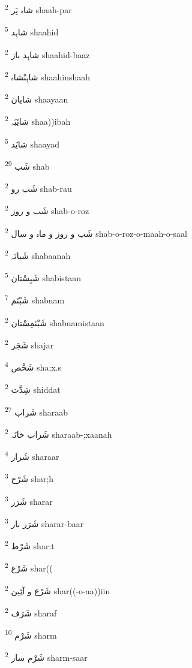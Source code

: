 \documentclass[12pt]{article}
\begin{document}
\begin{RTL}
\begin{multicols}{5}
{\ur شاہ پَر}   \textsuperscript{2} shaah-par

{\ur شاہِد}   \textsuperscript{5} shaahid

{\ur شاہِد باز}   \textsuperscript{2} shaahid-baaz

{\ur شاہِنْشاہ}   \textsuperscript{2} shaahinshaah

{\ur شایان}   \textsuperscript{2} shaayaan

{\ur شائِبَہ}   \textsuperscript{2} shaa))ibah

{\ur شایَد}   \textsuperscript{5} shaayad

{\ur شَب}   \textsuperscript{29} shab

{\ur شَب رو}   \textsuperscript{2} shab-rau

{\ur شَب و روز}   \textsuperscript{2} shab-o-roz

{\ur شَب و روز و ماہ و سال}   \textsuperscript{2} shab-o-roz-o-maah-o-saal

{\ur شَبانَہ}   \textsuperscript{2} shabaanah

{\ur شَبِسْتان}   \textsuperscript{5} shabistaan

{\ur شَبْنَم}   \textsuperscript{7} shabnam

{\ur شَبْنَمِسْتان}   \textsuperscript{2} shabnamistaan

{\ur شَجَر}   \textsuperscript{2} shajar

{\ur شَخْص}   \textsuperscript{4} sha;x.s

{\ur شِدَّت}   \textsuperscript{2} shiddat

{\ur شَراب}   \textsuperscript{27} sharaab

{\ur شَراب خانَہ}   \textsuperscript{2} sharaab-;xaanah

{\ur شَرار}   \textsuperscript{4} sharaar

{\ur شَرْح}   \textsuperscript{3} shar;h

{\ur شَرَر}   \textsuperscript{3} sharar

{\ur شَرَر بار}   \textsuperscript{3} sharar-baar

{\ur شَرْط}   \textsuperscript{2} shar:t

{\ur شَرْع}   \textsuperscript{2} shar((

{\ur شَرْع و آئِین}   \textsuperscript{2} shar((-o-aa))iin

{\ur شَرَف}   \textsuperscript{2} sharaf

{\ur شَرْم}   \textsuperscript{10} sharm

{\ur شَرْم سار}   \textsuperscript{2} sharm-saar


\end{multicols}
\end{RTL}
\end{document}
